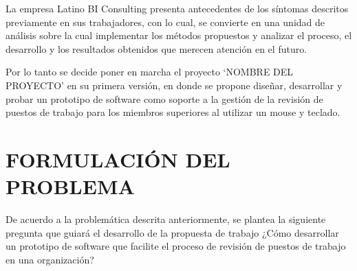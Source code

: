 La empresa Latino BI Consulting presenta antecedentes de los síntomas descritos previamente en sus trabajadores, con lo cual, se convierte en una unidad de análisis sobre la cual implementar los métodos propuestos y analizar el proceso, el desarrollo y los resultados obtenidos que merecen atención en el futuro.

Por lo tanto se decide poner en marcha el proyecto ‘NOMBRE DEL PROYECTO’ en su primera versión, en donde se propone diseñar, desarrollar y probar un prototipo de software como soporte a la gestión de la revisión de puestos de trabajo para los miembros superiores al utilizar un mouse y teclado.

\section{FORMULACIÓN DEL PROBLEMA}
De acuerdo a la problemática descrita anteriormente, se plantea la siguiente pregunta que guiará el desarrollo de la propuesta de trabajo ¿Cómo desarrollar un prototipo de software que facilite el proceso de revisión de puestos de trabajo en una organización?